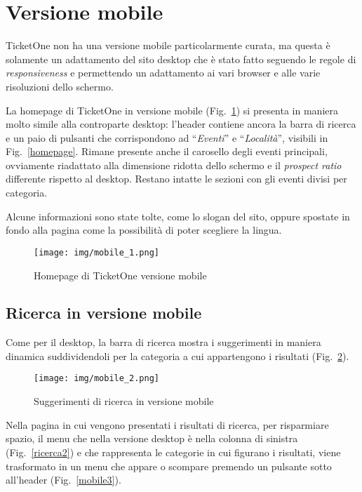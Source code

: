 \section{Versione mobile}\label{mobile}

TicketOne non ha una versione mobile particolarmente curata, ma questa è solamente un adattamento del sito desktop che è stato fatto seguendo le regole di \textit{responsiveness} e permettendo un adattamento ai vari browser e alle varie risoluzioni dello schermo.
\par La homepage di TicketOne in versione mobile (Fig.~\ref{mobile1}) si presenta in maniera molto simile alla controparte desktop: l'header contiene ancora la barra di ricerca e un paio di pulsanti che corrispondono ad ``\textit{Eventi}'' e ``\textit{Località}'', visibili in Fig.~\ref{homepage}.
Rimane presente anche il carosello degli eventi principali, ovviamente riadattato alla dimensione ridotta dello schermo e il \textit{prospect ratio} differente rispetto al desktop.
Restano intatte le sezioni con gli eventi divisi per categoria.
\par Alcune informazioni sono state tolte, come lo slogan del sito, oppure spostate in fondo alla pagina come la possibilità di poter scegliere la lingua.

\begin{figure}[H]
	\centering
	\texttt{[image: img/mobile\_1.png]}
	\caption{Homepage di TicketOne versione mobile}
	\label{mobile1}
\end{figure}

\subsection{Ricerca in versione mobile}

	Come per il desktop, la barra di ricerca mostra i suggerimenti in maniera dinamica suddividendoli per la categoria a cui appartengono i risultati (Fig.~\ref{mobile2}).
	
	\begin{figure}[H]
		\centering
		\texttt{[image: img/mobile\_2.png]}
		\caption{Suggerimenti di ricerca in versione mobile}
		\label{mobile2}
	\end{figure}
	
	Nella pagina in cui vengono presentati i risultati di ricerca, per risparmiare spazio, il menu che nella versione desktop è nella colonna di sinistra (Fig.~\ref{ricerca2}) e che rappresenta le categorie in cui figurano i risultati, viene trasformato in un menu che appare o scompare premendo un pulsante sotto all'header (Fig.~\ref{mobile3}).
	
